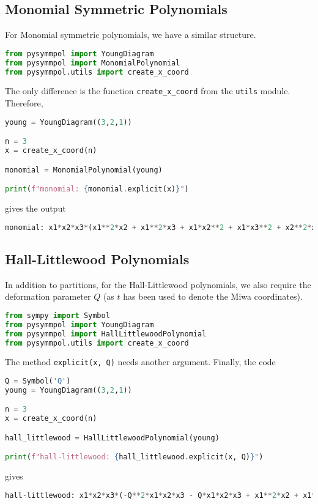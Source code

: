 \documentclass[a4paper,10pt]{amsart}
\begin{document}
\subsection{Monomial Symmetric Polynomials}

For Monomial symmetric polynomials, we have a similar structure. 
\begin{lstlisting}[language=Python]
from pysymmpol import YoungDiagram
from pysymmpol import MonomialPolynomial
from pysymmpol.utils import create_x_coord
\end{lstlisting}
The only difference is the function \verb|create_x_coord| from the
\verb|utils| module. Therefore,
\begin{lstlisting}[language=Python]
young = YoungDiagram((3,2,1))

n = 3
x = create_x_coord(n)

monomial = MonomialPolynomial(young)

print(f"monomial: {monomial.explicit(x)}")
\end{lstlisting}
gives the output 
\begin{lstlisting}[language=Python]
monomial: x1*x2*x3*(x1**2*x2 + x1**2*x3 + x1*x2**2 + x1*x3**2 + x2**2*x3 + x2*x3**2)
\end{lstlisting}

\subsection{Hall-Littlewood Polynomials}

In addition to partitions, for the Hall-Littlewood polynomials, 
we also require the deformation parameter \(Q\) (as \(t\) has been used to 
denote the Miwa coordinates).
\begin{lstlisting}[language=Python]
from sympy import Symbol
from pysymmpol import YoungDiagram
from pysymmpol import HallLittlewoodPolynomial
from pysymmpol.utils import create_x_coord
\end{lstlisting}
The method \verb|explicit(x, Q)| needs another argument. Finally, the code
\begin{lstlisting}[language=Python]
Q = Symbol('Q')
young = YoungDiagram((3,2,1))

n = 3
x = create_x_coord(n)

hall_littlewood = HallLittlewoodPolynomial(young)

print(f"hall-littlewood: {hall_littlewood.explicit(x, Q)}")
\end{lstlisting}
gives
\begin{lstlisting}[language=Python]
hall-littlewood: x1*x2*x3*(-Q**2*x1*x2*x3 - Q*x1*x2*x3 + x1**2*x2 + x1**2*x3 + x1*x2**2 + 2*x1*x2*x3 + x1*x3**2 + x2**2*x3 + x2*x3**2)
\end{lstlisting}
\end{document}

